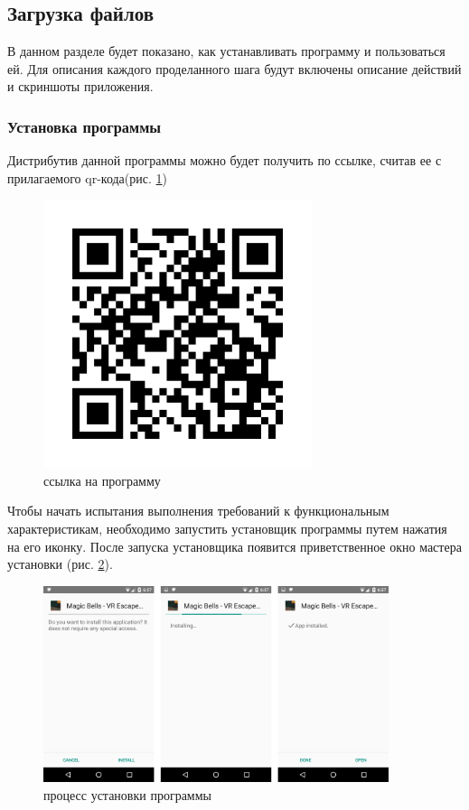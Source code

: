 \subsection{Загрузка файлов}
В данном разделе будет показано, как устанавливать программу и пользоваться ей. Для описания каждого проделанного шага будут включены описание действий и скриншоты приложения.
\subsubsection{Установка программы}
Дистрибутив данной программы можно будет получить по ссылке, считав ее с
прилагаемого qr-кода(рис. \ref{ref})

\begin{figure}[h!]
    \centering
    \includegraphics[width=0.7\textwidth]{./screenshots/qr-code.png}
    \caption{ссылка на программу}
    \label{ref}
\end{figure}

Чтобы начать испытания выполнения требований к функциональным характеристикам,
необходимо запустить установщик программы путем нажатия на его иконку. После
запуска установщика появится приветственное окно мастера установки (рис. \ref{install}).

\begin{figure}[h!]
    \centering
    \includegraphics[width=0.9\textwidth]{./screenshots/install.jpg}
    \caption{процесс установки программы}
    \label{install}
\end{figure}

